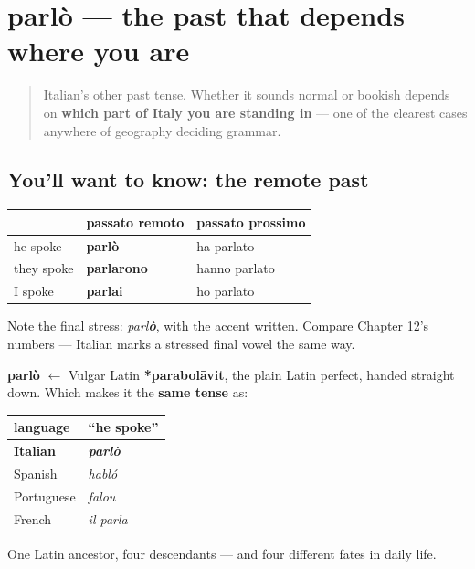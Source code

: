 \section[parlò]{parlò — the past that depends where you are}

\label{lesson:IT-C15-passato-remoto}



\begin{quote}
Italian's other past tense. Whether it sounds normal or bookish depends on \textbf{which part of Italy you are standing in} — one of the clearest cases anywhere of geography deciding grammar.
\end{quote}

\subsection*{You'll want to know: the remote past}
\noindent
\begin{tabularx}{\linewidth}{@{}>{\raggedright\arraybackslash}X>{\raggedright\arraybackslash}X>{\raggedright\arraybackslash}X@{}}
\toprule
\textbf{} & \textbf{passato remoto} & \textbf{passato prossimo} \\
\midrule
he spoke & \textbf{parlò} & ha parlato \\
they spoke & \textbf{parlarono} & hanno parlato \\
I spoke & \textbf{parlai} & ho parlato \\
\bottomrule
\end{tabularx}

Note the final stress: \emph{parl\textbf{ò}}, with the accent written. Compare Chapter 12's numbers — Italian marks a stressed final vowel the same way.

\begin{cousinweb}
\textbf{parlò} $\leftarrow$ Vulgar Latin \textbf{*parabolāvit}, the plain Latin perfect, handed straight down. Which makes it the \textbf{same tense} as:

\noindent
\begin{tabularx}{\linewidth}{@{}>{\raggedright\arraybackslash}X>{\raggedright\arraybackslash}X@{}}
\toprule
\textbf{language} & \textbf{\textquotedblleft{}he spoke\textquotedblright{}} \\
\midrule
\textbf{Italian} & \emph{\textbf{parlò}} \\
Spanish & \emph{habló} \\
Portuguese & \emph{falou} \\
French & \emph{il parla} \\
\bottomrule
\end{tabularx}

One Latin ancestor, four descendants — and four different fates in daily life.
\end{cousinweb}

